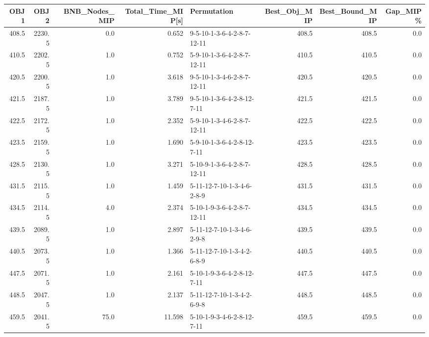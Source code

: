 \begin{tabular}{rrrrlrrr}
\toprule
  OBJ1 &    OBJ2 &  BNB\_Nodes\_MIP &  Total\_Time\_MIP[s] &                 Permutation &  Best\_Obj\_MIP &  Best\_Bound\_MIP &  Gap\_MIP\% \\
\midrule
 408.5 &  2230.5 &            0.0 &              0.652 &  9-5-10-1-3-6-4-2-8-7-12-11 &         408.5 &           408.5 &       0.0 \\
 410.5 &  2202.5 &            1.0 &              0.752 &  5-9-10-1-3-6-4-2-8-7-12-11 &         410.5 &           410.5 &       0.0 \\
 420.5 &  2200.5 &            1.0 &              3.618 &  9-5-10-1-3-4-6-2-8-7-12-11 &         420.5 &           420.5 &       0.0 \\
 421.5 &  2187.5 &            1.0 &              3.789 &  9-5-10-1-3-6-4-2-8-12-7-11 &         421.5 &           421.5 &       0.0 \\
 422.5 &  2172.5 &            1.0 &              2.352 &  5-9-10-1-3-4-6-2-8-7-12-11 &         422.5 &           422.5 &       0.0 \\
 423.5 &  2159.5 &            1.0 &              1.690 &  5-9-10-1-3-6-4-2-8-12-7-11 &         423.5 &           423.5 &       0.0 \\
 428.5 &  2130.5 &            1.0 &              3.271 &  5-10-9-1-3-6-4-2-8-7-12-11 &         428.5 &           428.5 &       0.0 \\
 431.5 &  2115.5 &            1.0 &              1.459 &  5-11-12-7-10-1-3-4-6-2-8-9 &         431.5 &           431.5 &       0.0 \\
 434.5 &  2114.5 &            4.0 &              2.374 &  5-10-1-9-3-6-4-2-8-7-12-11 &         434.5 &           434.5 &       0.0 \\
 439.5 &  2089.5 &            1.0 &              2.897 &  5-11-12-7-10-1-3-4-6-2-9-8 &         439.5 &           439.5 &       0.0 \\
 440.5 &  2073.5 &            1.0 &              1.366 &  5-11-12-7-10-1-3-4-2-6-8-9 &         440.5 &           440.5 &       0.0 \\
 447.5 &  2071.5 &            1.0 &              2.161 &  5-10-1-9-3-6-4-2-8-12-7-11 &         447.5 &           447.5 &       0.0 \\
 448.5 &  2047.5 &            1.0 &              2.137 &  5-11-12-7-10-1-3-4-2-6-9-8 &         448.5 &           448.5 &       0.0 \\
 459.5 &  2041.5 &           75.0 &             11.598 &  5-10-1-9-3-4-6-2-8-12-7-11 &         459.5 &           459.5 &       0.0 \\

\end{tabular}
